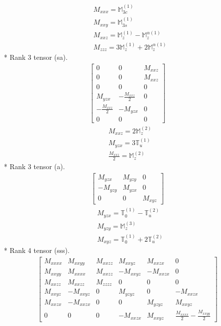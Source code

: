 \documentclass[fleqn,8pt,landscape]{jsarticle}
\begin{document}
\begin{align*}
& M_{xxx} = \mathbb{M}_{3c}^{(1)} \\
& M_{xxy} = \mathbb{M}_{3s}^{(1)} \\
& M_{xxz} = \mathbb{M}_{z}^{(1)} - \mathbb{M}_{z}^{\alpha(1)} \\
& M_{zzz} = 3 \mathbb{M}_{z}^{(1)} + 2 \mathbb{M}_{z}^{\alpha(1)}
\end{align*}
* Rank 3 tensor (sa).
\begin{align*}
\begin{bmatrix} 0 & 0 & M_{xxz} \\ 0 & 0 & M_{xxz} \\ 0 & 0 & 0 \\ M_{yzx} & - \frac{M_{xxz}}{2} & 0 \\ - \frac{M_{xxz}}{2} & - M_{yzx} & 0 \\ 0 & 0 & 0 \end{bmatrix}
\end{align*}
\begin{align*}
& M_{xxz} = 2 \mathbb{M}_{z}^{(2)} \\
& M_{yzx} = 3 \mathbb{T}_{u}^{(1)} \\
& \frac{M_{xxz}}{2} = \mathbb{M}_{z}^{(2)}
\end{align*}
* Rank 3 tensor (a).
\begin{align*}
\begin{bmatrix} M_{yzx} & M_{yzy} & 0 \\ - M_{yzy} & M_{yzx} & 0 \\ 0 & 0 & M_{xyz} \end{bmatrix}
\end{align*}
\begin{align*}
& M_{yzx} = \mathbb{T}_{0}^{(1)} - \mathbb{T}_{u}^{(2)} \\
& M_{yzy} = \mathbb{M}_{z}^{(3)} \\
& M_{xyz} = \mathbb{T}_{0}^{(1)} + 2 \mathbb{T}_{u}^{(2)}
\end{align*}
* Rank 4 tensor (sss).
\begin{align*}
\begin{bmatrix} M_{xxxx} & M_{xxyy} & M_{xxzz} & M_{xxyz} & M_{xxzx} & 0 \\ M_{xxyy} & M_{xxxx} & M_{xxzz} & - M_{xxyz} & - M_{xxzx} & 0 \\ M_{xxzz} & M_{xxzz} & M_{zzzz} & 0 & 0 & 0 \\ M_{xxyz} & - M_{xxyz} & 0 & M_{yzyz} & 0 & - M_{xxzx} \\ M_{xxzx} & - M_{xxzx} & 0 & 0 & M_{yzyz} & M_{xxyz} \\ 0 & 0 & 0 & - M_{xxzx} & M_{xxyz} & \frac{M_{xxxx}}{2} - \frac{M_{xxyy}}{2} \end{bmatrix}
\end{align*}
\end{document}

